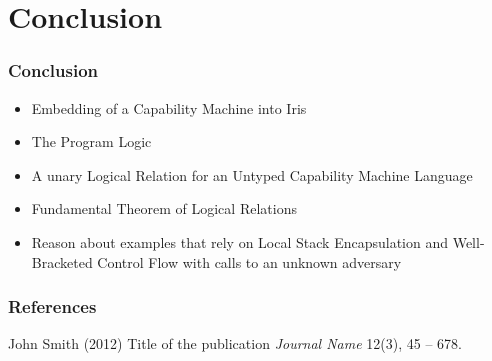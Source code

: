 \documentclass{beamer}
\begin{document}
\section{Conclusion}

\begin{frame}
\frametitle{Conclusion}

\begin{itemize}
	\item Embedding of a Capability Machine into Iris
	\item The Program Logic 
	\item A unary Logical Relation for an Untyped Capability Machine Language
	\item Fundamental Theorem of Logical Relations
	\item Reason about examples that rely on Local Stack Encapsulation and Well-Bracketed Control Flow with calls to an unknown adversary
\end{itemize}

\end{frame}



\begin{frame}
\frametitle{References}
\footnotesize{
\begin{thebibliography}{99} %
 John Smith (2012)
\newblock Title of the publication
\newblock \emph{Journal Name} 12(3), 45 -- 678.
\end{thebibliography}
}
\end{frame}

\end{document}
